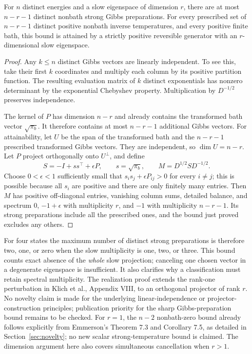 \begin{theorem}\label{thm:strongdimension}
For $n$ distinct energies and a slow eigenspace of dimension $r$, there are at
most $n-r-1$ distinct nonbath strong Gibbs preparations. For every prescribed
set of $n-r-1$ distinct positive nonbath inverse temperatures, and every
positive finite bath, this bound is attained by a strictly positive reversible
generator with an $r$-dimensional slow eigenspace.
\end{theorem}
\begin{proof}
Any $k\leq n$ distinct Gibbs vectors are linearly independent. To see this,
take their first $k$ coordinates and multiply each column by its positive
partition function. The resulting evaluation matrix of $k$ distinct
exponentials has nonzero determinant by the exponential Chebyshev property.
Multiplication by $D^{-1/2}$ preserves independence.

The kernel of $P$ has dimension $n-r$ and already contains the transformed
bath vector $\sqrt{\pi_b}$. It therefore contains at most $n-r-1$ additional
Gibbs vectors. For attainability, let $U$ be the span of the transformed bath
and the $n-r-1$ prescribed transformed Gibbs vectors. They are independent,
so $\dim U=n-r$. Let $P$ project orthogonally onto $U^\perp$, and define
\[
S=-I+ss^\top+\epsilon P,\qquad s=\sqrt{\pi_b},\qquad
M=D^{1/2}SD^{-1/2}.
\]
Choose $0<\epsilon<1$ sufficiently small that
$s_is_j+\epsilon P_{ij}>0$ for every $i\ne j$; this is possible because all
$s_i$ are positive and there are only finitely many entries. Then $M$ has
positive off-diagonal entries, vanishing column sums, detailed balance, and
spectrum $0$, $-1+\epsilon$ with multiplicity $r$, and $-1$ with multiplicity
$n-r-1$. Its strong preparations include all the prescribed ones, and the
bound just proved excludes any others.
\end{proof}

For four states the maximum number of distinct strong preparations is therefore
two, one, or zero when the slow multiplicity is one, two, or three. This bound
counts exact absence of the \emph{whole} slow projection; canceling one chosen
vector in a degenerate eigenspace is insufficient. It also clarifies why a
classification must retain spectral multiplicity. The realization proof extends the rank-one perturbation in Klich et al.,
Appendix VIII, to an orthogonal projector of rank $r$. No novelty claim is made
for the underlying linear-independence or projector-construction principles;
publication priority for the sharp Gibbs-preparation bound remains to be checked.
For $r=1$, the $n-2$ nonbath-zero bound already follows explicitly from
Emmerson's Theorem 7.3 and Corollary 7.5, as detailed in
Section~\ref{sec:novelty}; no new scalar strong-temperature bound is claimed.
The dimension argument here also covers simultaneous cancellation when $r>1$.

